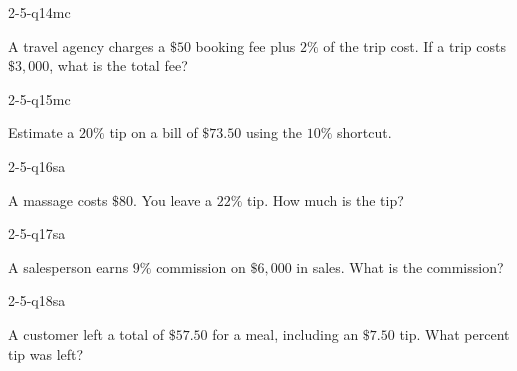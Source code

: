 \begin{practiceQuestion}{2-5-q14}{mc}
\begin{questionText}
A travel agency charges a $\$50$ booking fee plus $2\%$ of the trip cost. If a trip costs $\$3{,}000$, what is the total fee?
\end{questionText}
\end{practiceQuestion}

\begin{practiceQuestion}{2-5-q15}{mc}
\begin{questionText}
Estimate a $20\%$ tip on a bill of $\$73.50$ using the $10\%$ shortcut.
\end{questionText}
\end{practiceQuestion}


\begin{practiceQuestion}{2-5-q16}{sa}
\begin{questionText}
A massage costs $\$80$. You leave a $22\%$ tip. How much is the tip?
\end{questionText}
\end{practiceQuestion}

\begin{practiceQuestion}{2-5-q17}{sa}
\begin{questionText}
A salesperson earns $9\%$ commission on $\$6{,}000$ in sales. What is the commission?
\end{questionText}
\end{practiceQuestion}

\begin{practiceQuestion}{2-5-q18}{sa}
\begin{questionText}
A customer left a total of $\$57.50$ for a meal, including an $\$7.50$ tip. What percent tip was left?
\end{questionText}
\end{practiceQuestion}

